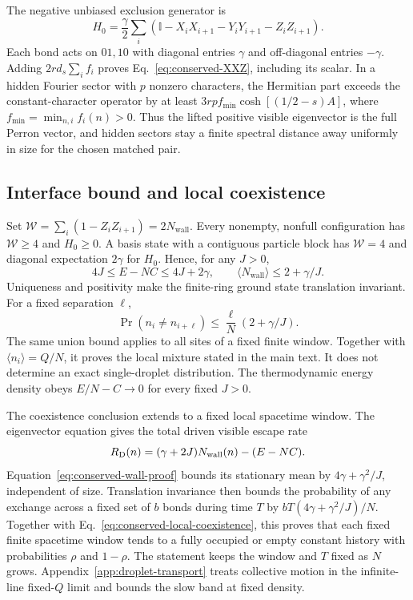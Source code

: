 \documentclass[aps,pre,reprint,amsmath,amssymb,longbibliography,floatfix]{revtex4-2}
\newcommand{\Id}{\mathbb I}
\begin{document}
The negative unbiased exclusion generator is
\begin{equation}
 H_0=\frac\gamma2\sum_i
 (\Id-X_iX_{i+1}-Y_iY_{i+1}-Z_iZ_{i+1}).
 \label{eq:conserved-H0}
\end{equation}
Each bond acts on $01,10$ with diagonal entries $\gamma$ and
off-diagonal entries $-\gamma$. Adding $2rd_s\sum_i f_i$ proves
Eq.~\eqref{eq:conserved-XXZ}, including its scalar.
In a hidden Fourier sector with $p$ nonzero characters, the Hermitian
part exceeds the constant-character operator by at least
$3rp f_{\min}\cosh\left[(1/2-s)A\right]$, where $f_{\min}=\min_{n,i}f_i(n)>0$.
Thus the lifted positive visible eigenvector is the full Perron vector,
and hidden sectors stay a finite spectral distance away uniformly in
size for the chosen matched pair.

\subsection{Interface bound and local coexistence}
Set $\mathcal W=\sum_i(1-Z_iZ_{i+1})=2N_{\mathrm{wall}}$. Every
nonempty, nonfull configuration has $\mathcal W\geq4$ and $H_0\geq0$.
A basis state with a contiguous particle block has $\mathcal W=4$ and
diagonal expectation $2\gamma$ for $H_0$. Hence, for any $J>0$,
\begin{equation}
 4J\leq E-NC\leq4J+2\gamma,
 \qquad\langle N_{\mathrm{wall}}\rangle\leq2+\gamma/J.
 \label{eq:conserved-wall-proof}
\end{equation}
Uniqueness and positivity make the finite-ring ground state translation
invariant. For a fixed separation $\ell$,
\begin{equation}
 \Pr(n_i\ne n_{i+\ell})
 \leq\frac\ell N(2+\gamma/J).
 \label{eq:conserved-local-coexistence}
\end{equation}
The same union bound applies to all sites of a fixed finite window.
Together with $\langle n_i\rangle=Q/N$, it proves the local mixture
stated in the main text. It does not determine an exact single-droplet
distribution. The thermodynamic energy density obeys
$E/N-C\to0$ for every fixed $J>0$.

The coexistence conclusion extends to a fixed local spacetime window.
The eigenvector equation gives the total driven visible escape rate
\begin{equation}
 R_{\rm D}(n)=(\gamma+2J)N_{\mathrm{wall}}(n)-(E-NC).
 \label{eq:conserved-escape}
\end{equation}
Equation~\eqref{eq:conserved-wall-proof} bounds its stationary mean by
$4\gamma+\gamma^2/J$, independent of size. Translation invariance then
bounds the probability of any exchange across a fixed set of $b$ bonds
during time $T$ by $bT(4\gamma+\gamma^2/J)/N$.
Together with Eq.~\eqref{eq:conserved-local-coexistence}, this proves that
each fixed finite spacetime window tends to a fully occupied or empty
constant history with probabilities $\rho$ and $1-\rho$. The statement
keeps the window and $T$ fixed as $N$ grows.
Appendix~\ref{app:droplet-transport} treats collective motion in the
infinite-line fixed-$Q$ limit and bounds the slow band at fixed density.
\end{document}
